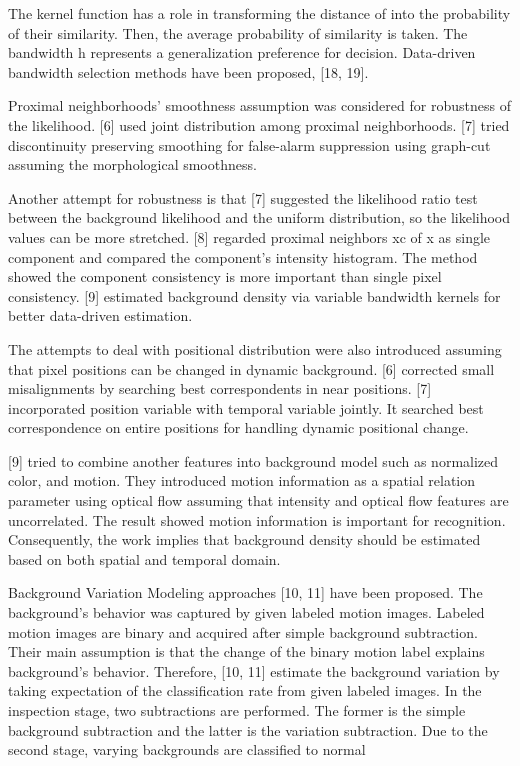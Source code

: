 \documentclass[a4paper,twocolumn, 10pt]{article}
\begin{document}
The kernel function has a role in transforming the distance of   into the probability of their similarity. Then, the average probability of similarity is taken. The bandwidth h represents a generalization preference for decision. Data-driven bandwidth selection methods have been proposed, [18, 19].

Proximal neighborhoods’ smoothness assumption was considered for robustness of the likelihood. [6] used joint distribution among proximal neighborhoods. [7] tried discontinuity preserving smoothing for false-alarm suppression using graph-cut assuming the morphological smoothness.

Another attempt for robustness is that [7] suggested the likelihood ratio test between the background likelihood and the uniform distribution, so the likelihood values can be more stretched. [8] regarded proximal neighbors xc of x as single component and compared the component’s intensity histogram. The method showed the component consistency is more important than single pixel consistency. [9] estimated background density via variable bandwidth kernels for better data-driven estimation.

The attempts to deal with positional distribution were also introduced assuming that pixel positions can be changed in dynamic background. [6] corrected small misalignments by searching best correspondents in near positions. [7] incorporated position variable with temporal variable jointly. It searched best correspondence on entire positions for handling dynamic positional change.

[9] tried to combine another features into background model such as normalized color, and motion. They introduced motion information as a spatial relation parameter using optical flow assuming that intensity and optical flow features are uncorrelated. The result showed motion information is important for recognition. Consequently, the work implies that background density should be estimated based on both spatial and temporal domain.

  Background Variation Modeling approaches [10, 11] have been proposed. The background’s behavior was captured by given labeled motion images. Labeled motion images   are binary and acquired after simple background subtraction. Their main assumption is that the change of the binary motion label explains background’s behavior. Therefore, [10, 11] estimate the background variation by taking expectation of the classification rate from given labeled images. In the inspection stage, two subtractions are performed. The former is the simple background subtraction and the latter is the variation subtraction. Due to the second stage, varying backgrounds are classified to normal 
\end{document}
